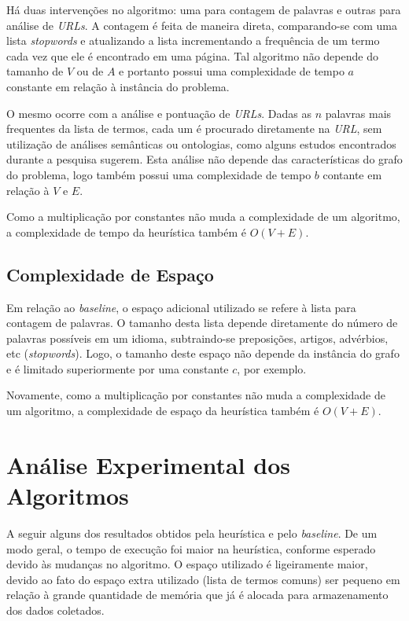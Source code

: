 \documentclass[a4paper,12pt,titlepage]{article}
\begin{document}
Há duas intervenções no algoritmo: uma para contagem de palavras e outras para análise de \textit{URLs}. A contagem é feita de maneira direta, comparando-se com uma lista \textit{stopwords} e atualizando a lista incrementando a frequência de um termo cada vez que ele é encontrado em uma página. Tal algoritmo não depende do tamanho de $V$ ou de $A$ e portanto possui uma complexidade de tempo $a$ constante em relação à instância do problema. 

O mesmo ocorre com a análise e pontuação de \textit{URLs}. Dadas as $n$ palavras mais frequentes da lista de termos, cada um é procurado diretamente na \textit{URL}, sem utilização de análises semânticas ou ontologias, como alguns estudos encontrados durante a pesquisa sugerem. Esta análise não depende das características do grafo do problema, logo também possui uma complexidade de tempo $b$ contante em relação à $V$ e $E$.

Como a multiplicação por constantes não muda a complexidade de um algoritmo, a complexidade de tempo da heurística também é $O(V+E)$.

\subsection{Complexidade de Espaço}

Em relação ao \textit{baseline}, o espaço adicional utilizado se refere à lista para contagem de palavras. O tamanho desta lista depende diretamente do número de palavras possíveis em um idioma, subtraindo-se preposições, artigos, advérbios, etc (\textit{stopwords}). Logo, o tamanho deste espaço não depende da instância do grafo e é limitado superiormente por uma constante $c$, por exemplo.

Novamente, como a multiplicação por constantes não muda a complexidade de um algoritmo, a complexidade de espaço da heurística também é $O(V+E)$.

\section{Análise Experimental dos Algoritmos}

A seguir alguns dos resultados obtidos pela heurística e pelo \textit{baseline}. De um modo geral, o tempo de execução foi maior na heurística, conforme esperado devido às mudanças no algoritmo. O espaço utilizado é ligeiramente maior, devido ao fato do espaço extra utilizado (lista de termos comuns) ser pequeno em relação à grande quantidade de memória que já é alocada para armazenamento dos dados coletados.
\end{document}
